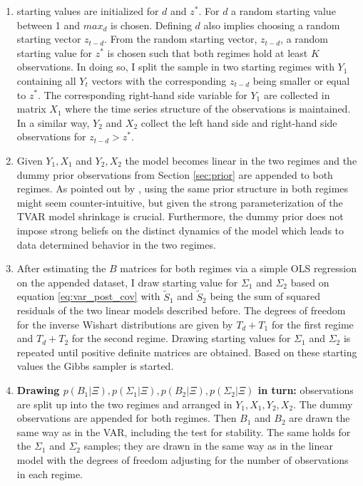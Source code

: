 \documentclass[12pt,letterpaper,fleqn]{article}           %
\begin{document}
\begin{enumerate}
\item starting values are initialized for $d$ and $z^*$. For $d$ a random starting value between 1 and $max_d$ is chosen. Defining $d$ also implies choosing a random starting vector $z_{t-d}$. From the random starting vector, $z_{t-d}$, a random starting value for $z^*$ is chosen such that both regimes hold at least $K$ observations. In doing so, I split the sample in two starting regimes with $Y_1$ containing all $Y_t$ vectors with the corresponding $z_{t-d}$ being smaller or equal to $z^*$. The corresponding right-hand side variable for $Y_1$ are collected in matrix $X_1$ where the time series structure of the observations is maintained. In a similar way, $Y_2$ and $X_2$ collect the left hand side and right-hand side observations for $z_{t-d} > z^*$. 
\item Given $Y_1, X_1$ and $Y_2, X_2$ the model becomes linear in the two regimes and the dummy prior observations from Section \ref{sec:prior} are appended to both regimes. As pointed out by \textcite{alessandri17}, using the same prior structure in both regimes might seem counter-intuitive, but given the strong parameterization of the TVAR model shrinkage is crucial. Furthermore, the dummy prior does not impose strong beliefs on the distinct dynamics of the model which leads to data determined behavior in the two regimes.
\item After estimating the $B$ matrices for both regimes via a simple OLS regression on the appended dataset, I draw starting value for $\Sigma_1$ and $\Sigma_2$ based on equation \eqref{eq:var_post_cov} with $\tilde{S}_1$ and $\tilde{S}_2$ being the sum of squared residuals of the two linear models described before. The degrees of freedom for the inverse Wishart distributions are given by $T_d + T_1$ for the first regime and $T_d + T_2$ for the second regime. Drawing starting values for $\Sigma_1$ and $\Sigma_2$ is repeated until positive definite matrices are obtained. Based on these starting values the Gibbs sampler is started.
\item \textbf{Drawing $p(B_1|\Xi), p(\Sigma_1|\Xi), p(B_2|\Xi), p(\Sigma_2|\Xi)$ in turn:} observations are split up into the two regimes and arranged in $Y_1, X_1, Y_2, X_2$. The dummy observations are appended for both regimes. Then $B_1$ and $B_2$ are drawn the same way as in the VAR, including the test for stability. The same holds for the  $\Sigma_1$ and $\Sigma_2$ samples; they are drawn in the same way as in the linear model with the degrees of freedom adjusting for the number of observations in each regime.

\end{enumerate}
\end{document}
